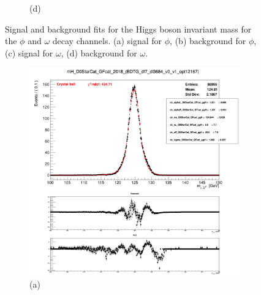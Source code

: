 \begin{figure}[!ht]
\begin{subfigure}[t]{0.50\mylength}
        \caption{\footnotesize (d)}
    \end{subfigure}%
\caption{Signal and background fits for the Higgs boson invariant mass for the $\phi$ and $\omega$ decay channels. (a) signal for $\phi$, (b) background for $\phi$, (c) signal for $\omega$, (d) background for $\omega$.}
\label{fig:sig_bkg_modelling_phi_omega}
    \vspace*{-0.0cm}
\end{figure}

\begin{figure}[!ht]
    \captionsetup[subfigure]{labelformat=empty}
    \vspace*{-0.2cm}
    \centering
    \setlength{\mylength}{\textwidth}
    \begin{subfigure}[t]{0.50\mylength}
        \centering
        \includegraphics[width=0.45\mylength]{resources/plots/D0Star_2body_fit_SGN.png}
        \caption{\footnotesize (a)}
    \end{subfigure}%
    \begin{subfigure}[t]{0.50\mylength}
        \centering

\end{subfigure}
\end{figure}
